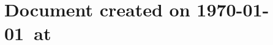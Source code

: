 \documentclass[a4paper]{book}
\begin{document}
% 
% 
% 
 
% 
% 
% 
% 
% 
% 
% 
% 
 \appendix
 
% 

 \listoffigures
 \lstlistoflistings
 \listoftables
 
\chapter*{Document created on \today~at \xxivtime}
\end{document}
